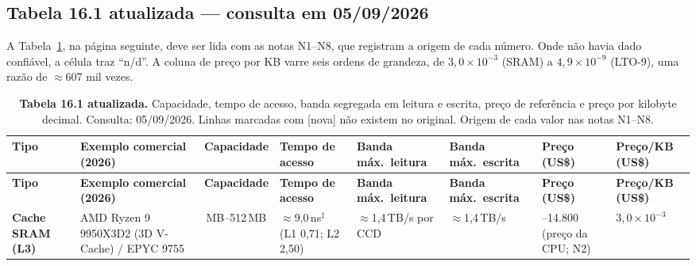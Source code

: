 \documentclass[11pt,a4paper]{article}
\renewcommand{\arraystretch}{1.15}
\begin{document}
\subsection{Tabela 16.1 atualizada --- consulta em 05/09/2026}

A Tabela~\ref{tab:161}, na página seguinte, deve ser lida com as notas N1--N8, que registram a origem de cada
número. Onde não havia dado confiável, a célula traz ``n/d''. A coluna de preço por KB varre
seis ordens de grandeza, de $3{,}0\times10^{-3}$ (SRAM) a $4{,}9\times10^{-9}$ (LTO-9), uma
razão de $\approx$607 mil vezes.

\begin{landscape}
\thispagestyle{empty}
{\footnotesize
\setlength{\tabcolsep}{4pt}
\renewcommand{\arraystretch}{1.0}
\begin{longtable}{@{}>{\RaggedRight\arraybackslash}p{3.4cm}>{\RaggedRight\arraybackslash}p{4.3cm}>{\RaggedRight\arraybackslash}p{2.4cm}>{\RaggedRight\arraybackslash}p{2.3cm}>{\RaggedRight\arraybackslash}p{2.2cm}>{\RaggedRight\arraybackslash}p{2.2cm}>{\RaggedRight\arraybackslash}p{3.1cm}>{\RaggedRight\arraybackslash}p{1.9cm}@{}}
\caption{\textbf{Tabela 16.1 atualizada.} Capacidade, tempo de acesso, banda segregada em
leitura e escrita, preço de referência e preço por kilobyte decimal. Consulta: 05/09/2026.
Linhas marcadas com [nova] não existem no original. Origem de cada valor nas notas N1--N8.}\label{tab:161}\\
\toprule
\textbf{Tipo} & \textbf{Exemplo comercial (2026)} & \textbf{Capacidade} &
\textbf{Tempo de acesso} & \textbf{Banda máx.\ leitura} & \textbf{Banda máx.\ escrita} &
\textbf{Preço (US\$)} & \textbf{Preço/KB (US\$)} \\
\midrule
\endfirsthead
\toprule
\textbf{Tipo} & \textbf{Exemplo comercial (2026)} & \textbf{Capacidade} &
\textbf{Tempo de acesso} & \textbf{Banda máx.\ leitura} & \textbf{Banda máx.\ escrita} &
\textbf{Preço (US\$)} & \textbf{Preço/KB (US\$)} \\
\midrule
\endhead
\bottomrule
\endfoot

\textbf{Cache SRAM (L3)} &
AMD Ryzen 9 9950X3D2 (3D V-Cache) / EPYC 9755 &
96\,MB--512\,MB &
$\approx$9,0\,ns$^{\ddagger}$ \newline (L1 0,71; L2 2,50) &
$\approx$1,4\,TB/s por CCD &
$\approx$1,4\,TB/s &
700--14.800 \newline (preço da CPU; N2) &
$3{,}0\times10^{-3}$ \\


\end{longtable}}
\end{landscape}
\end{document}
